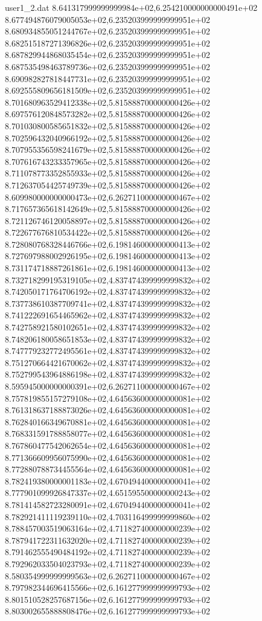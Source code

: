 \begin{filecontents}{user1_2.dat}
8.641317999999999984e+02,6.254210000000000491e+02
8.677494876079005053e+02,6.235203999999999951e+02
8.680934855051244767e+02,6.235203999999999951e+02
8.682515187271396826e+02,6.235203999999999951e+02
8.687829944868035454e+02,6.235203999999999951e+02
8.687535498463789736e+02,6.235203999999999951e+02
8.690982827818447731e+02,6.235203999999999951e+02
8.692555809656181509e+02,6.235203999999999951e+02
8.701680963529412338e+02,5.815888700000000426e+02
8.697576120848573282e+02,5.815888700000000426e+02
8.701030800585651832e+02,5.815888700000000426e+02
8.702596432040966192e+02,5.815888700000000426e+02
8.707955356598241679e+02,5.815888700000000426e+02
8.707616743233357965e+02,5.815888700000000426e+02
8.711078773352855933e+02,5.815888700000000426e+02
8.712637054425749739e+02,5.815888700000000426e+02
8.609980000000000473e+02,6.262711000000000467e+02
8.717657365618142649e+02,5.815888700000000426e+02
8.721126746120058897e+02,5.815888700000000426e+02
8.722677676810534422e+02,5.815888700000000426e+02
8.728080768328446766e+02,6.198146000000000413e+02
8.727697988002926195e+02,6.198146000000000413e+02
8.731174718887261861e+02,6.198146000000000413e+02
8.732718299195319105e+02,4.837474399999999832e+02
8.742050171764706192e+02,4.837474399999999832e+02
8.737738610387709741e+02,4.837474399999999832e+02
8.741222691654465962e+02,4.837474399999999832e+02
8.742758921580102651e+02,4.837474399999999832e+02
8.748206180058651853e+02,4.837474399999999832e+02
8.747779232772495561e+02,4.837474399999999832e+02
8.751270664421670062e+02,4.837474399999999832e+02
8.752799543964886198e+02,4.837474399999999832e+02
8.595945000000000391e+02,6.262711000000000467e+02
8.757819855157279108e+02,4.645636000000000081e+02
8.761318637188873026e+02,4.645636000000000081e+02
8.762840166349670881e+02,4.645636000000000081e+02
8.768331591788858077e+02,4.645636000000000081e+02
8.767860477542062654e+02,4.645636000000000081e+02
8.771366609956075990e+02,4.645636000000000081e+02
8.772880788734455564e+02,4.645636000000000081e+02
8.782419380000001183e+02,4.670494400000000041e+02
8.777901099926847337e+02,4.651595500000000243e+02
8.781414582723280091e+02,4.670494400000000041e+02
8.782921411119239110e+02,4.703116499999999860e+02
8.788457003519063164e+02,4.711827400000000239e+02
8.787941722311632020e+02,4.711827400000000239e+02
8.791462555490484192e+02,4.711827400000000239e+02
8.792962033504023793e+02,4.711827400000000239e+02
8.580354999999999563e+02,6.262711000000000467e+02
8.797982344696415566e+02,6.161277999999999793e+02
8.801510528257687156e+02,6.161277999999999793e+02
8.803002655888808476e+02,6.161277999999999793e+02

\end{filecontents}
